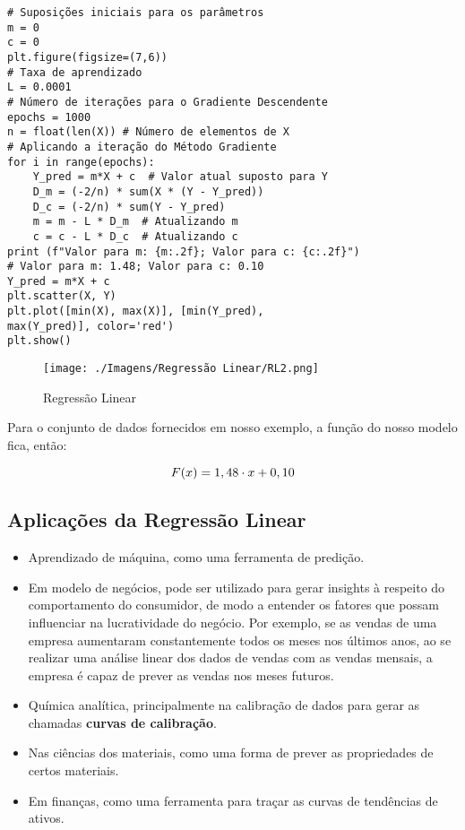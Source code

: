 \begin{verbatim}
# Suposições iniciais para os parâmetros
m = 0
c = 0
plt.figure(figsize=(7,6))
# Taxa de aprendizado
L = 0.0001  
# Número de iterações para o Gradiente Descendente
epochs = 1000  
n = float(len(X)) # Número de elementos de X
# Aplicando a iteração do Método Gradiente 
for i in range(epochs): 
	Y_pred = m*X + c  # Valor atual suposto para Y
	D_m = (-2/n) * sum(X * (Y - Y_pred)) 
	D_c = (-2/n) * sum(Y - Y_pred) 
	m = m - L * D_m  # Atualizando m
	c = c - L * D_c  # Atualizando c
print (f"Valor para m: {m:.2f}; Valor para c: {c:.2f}")
# Valor para m: 1.48; Valor para c: 0.10
Y_pred = m*X + c
plt.scatter(X, Y) 
plt.plot([min(X), max(X)], [min(Y_pred), 
max(Y_pred)], color='red')
plt.show()
\end{verbatim}

\begin{figure}[H]
	\centering
	\texttt{[image: ./Imagens/Regressão Linear/RL2.png]} 
	\caption{Regressão Linear}
	\label{fig:RL2}
\end{figure}

Para o conjunto de dados fornecidos em nosso exemplo, a função do nosso modelo fica, então:

\[ \large F(x) = 1,48 \cdot x + 0,10 \]

\subsection{Aplicações da Regressão Linear}

\begin{itemize}
\item Aprendizado de máquina, como uma ferramenta de predição.
\item Em modelo de negócios, pode ser utilizado para gerar insights à respeito do comportamento do consumidor, de modo a entender os fatores que possam influenciar na lucratividade do negócio. Por exemplo, se as vendas de uma empresa aumentaram constantemente todos os meses nos últimos anos, ao se realizar uma análise linear dos dados de vendas com as vendas mensais, a empresa é capaz de prever as vendas nos meses futuros. 
\item Química analítica, principalmente na calibração de dados para gerar as chamadas \textbf{curvas de calibração}.
\item Nas ciências dos materiais, como uma forma de prever as propriedades de certos materiais.
\item Em finanças, como uma ferramenta para traçar as curvas de tendências de ativos.

\end{itemize} 





